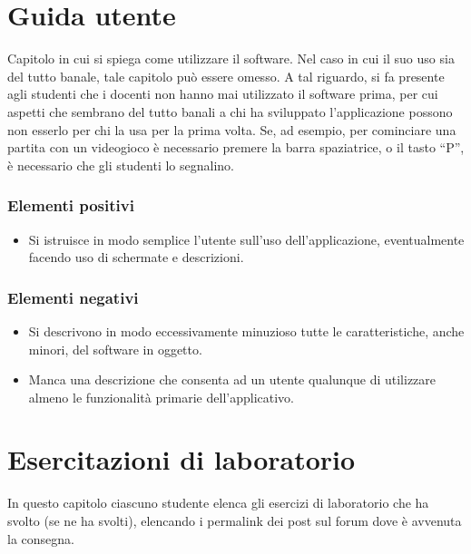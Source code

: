
\appendix
\chapter{Guida utente}

Capitolo in cui si spiega come utilizzare il software. Nel caso in cui il suo uso sia del tutto
banale, tale capitolo può essere omesso.
%
A tal riguardo, si fa presente agli studenti che i docenti non hanno mai utilizzato il software
prima, per cui aspetti che sembrano del tutto banali a chi ha sviluppato l'applicazione possono non
esserlo per chi la usa per la prima volta.
%
Se, ad esempio, per cominciare una partita con un videogioco è necessario premere la barra
spaziatrice, o il tasto ``P'', è necessario che gli studenti lo segnalino.

\subsection*{Elementi positivi}

\begin{itemize}
	\item Si istruisce in modo semplice l'utente sull'uso dell'applicazione, eventualmente facendo uso di schermate e descrizioni.
\end{itemize}

\subsection*{Elementi negativi}
\begin{itemize}
	\item Si descrivono in modo eccessivamente minuzioso tutte le caratteristiche, anche minori, del software in oggetto.
	\item Manca una descrizione che consenta ad un utente qualunque di utilizzare almeno le funzionalità primarie dell'applicativo.
\end{itemize}

\chapter{Esercitazioni di laboratorio}

In questo capitolo ciascuno studente elenca gli esercizi di laboratorio che ha svolto
(se ne ha svolti),
elencando i permalink dei post sul forum dove è avvenuta la consegna.

